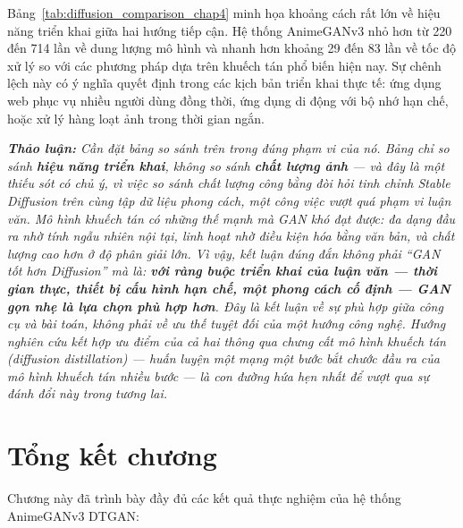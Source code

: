 
Bảng~\ref{tab:diffusion_comparison_chap4} minh họa khoảng cách rất lớn về hiệu năng triển khai giữa hai hướng tiếp cận. Hệ thống AnimeGANv3 nhỏ hơn từ 220 đến 714 lần về dung lượng mô hình và nhanh hơn khoảng 29 đến 83 lần về tốc độ xử lý so với các phương pháp dựa trên khuếch tán phổ biến hiện nay. Sự chênh lệch này có ý nghĩa quyết định trong các kịch bản triển khai thực tế: ứng dụng web phục vụ nhiều người dùng đồng thời, ứng dụng di động với bộ nhớ hạn chế, hoặc xử lý hàng loạt ảnh trong thời gian ngắn.

\medskip
\noindent\textit{\textbf{Thảo luận:} Cần đặt bảng so sánh trên trong đúng phạm vi của nó. Bảng chỉ so sánh \textbf{hiệu năng triển khai}, không so sánh \textbf{chất lượng ảnh} --- và đây là một thiếu sót có chủ ý, vì việc so sánh chất lượng công bằng đòi hỏi tinh chỉnh Stable Diffusion trên cùng tập dữ liệu phong cách, một công việc vượt quá phạm vi luận văn. Mô hình khuếch tán có những thế mạnh mà GAN khó đạt được: đa dạng đầu ra nhờ tính ngẫu nhiên nội tại, linh hoạt nhờ điều kiện hóa bằng văn bản, và chất lượng cao hơn ở độ phân giải lớn. Vì vậy, kết luận đúng đắn không phải ``GAN tốt hơn Diffusion'' mà là: \textbf{với ràng buộc triển khai của luận văn --- thời gian thực, thiết bị cấu hình hạn chế, một phong cách cố định --- GAN gọn nhẹ là lựa chọn phù hợp hơn}. Đây là kết luận về sự phù hợp giữa công cụ và bài toán, không phải về ưu thế tuyệt đối của một hướng công nghệ. Hướng nghiên cứu kết hợp ưu điểm của cả hai thông qua chưng cất mô hình khuếch tán (diffusion distillation) --- huấn luyện một mạng một bước bắt chước đầu ra của mô hình khuếch tán nhiều bước --- là con đường hứa hẹn nhất để vượt qua sự đánh đổi này trong tương lai.}

\section*{Tổng kết chương}

Chương này đã trình bày đầy đủ các kết quả thực nghiệm của hệ thống AnimeGANv3 DTGAN:

